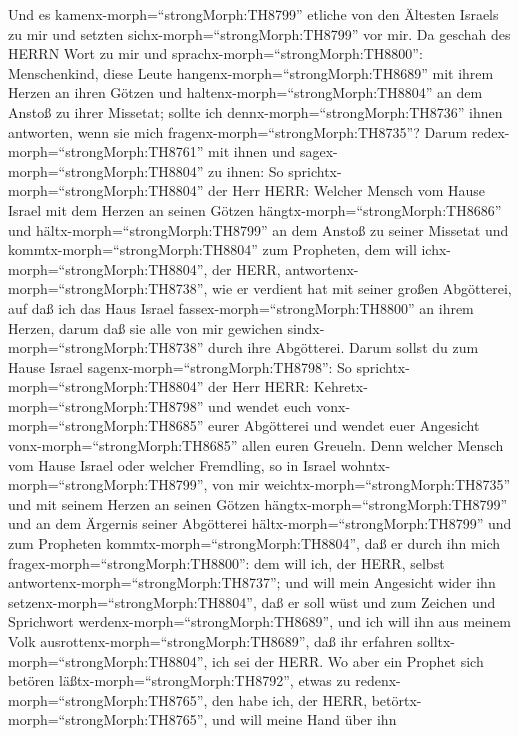  Und es kamenx-morph=``strongMorph:TH8799'' etliche von den
Ältesten Israels zu mir und setzten sichx-morph=``strongMorph:TH8799''
vor mir.  Da geschah des HERRN Wort zu mir und
sprachx-morph=``strongMorph:TH8800'':  Menschenkind, diese
Leute hangenx-morph=``strongMorph:TH8689'' mit ihrem Herzen an ihren
Götzen und haltenx-morph=``strongMorph:TH8804'' an dem Anstoß zu ihrer
Missetat; sollte ich dennx-morph=``strongMorph:TH8736'' ihnen antworten,
wenn sie mich fragenx-morph=``strongMorph:TH8735''?  Darum
redex-morph=``strongMorph:TH8761'' mit ihnen und
sagex-morph=``strongMorph:TH8804'' zu ihnen: So
sprichtx-morph=``strongMorph:TH8804'' der Herr HERR: Welcher Mensch vom
Hause Israel mit dem Herzen an seinen Götzen
hängtx-morph=``strongMorph:TH8686'' und
hältx-morph=``strongMorph:TH8799'' an dem Anstoß zu seiner Missetat und
kommtx-morph=``strongMorph:TH8804'' zum Propheten, dem will
ichx-morph=``strongMorph:TH8804'', der HERR,
antwortenx-morph=``strongMorph:TH8738'', wie er verdient hat mit seiner
großen Abgötterei,  auf daß ich das Haus Israel
fassex-morph=``strongMorph:TH8800'' an ihrem Herzen, darum daß sie alle
von mir gewichen sindx-morph=``strongMorph:TH8738'' durch ihre
Abgötterei.  Darum sollst du zum Hause Israel
sagenx-morph=``strongMorph:TH8798'': So
sprichtx-morph=``strongMorph:TH8804'' der Herr HERR:
Kehretx-morph=``strongMorph:TH8798'' und wendet euch
vonx-morph=``strongMorph:TH8685'' eurer Abgötterei und wendet euer
Angesicht vonx-morph=``strongMorph:TH8685'' allen euren Greueln.
 Denn welcher Mensch vom Hause Israel oder welcher
Fremdling, so in Israel wohntx-morph=``strongMorph:TH8799'', von mir
weichtx-morph=``strongMorph:TH8735'' und mit seinem Herzen an seinen
Götzen hängtx-morph=``strongMorph:TH8799'' und an dem Ärgernis seiner
Abgötterei hältx-morph=``strongMorph:TH8799'' und zum Propheten
kommtx-morph=``strongMorph:TH8804'', daß er durch ihn mich
fragex-morph=``strongMorph:TH8800'': dem will ich, der HERR, selbst
antwortenx-morph=``strongMorph:TH8737'';  und will mein
Angesicht wider ihn setzenx-morph=``strongMorph:TH8804'', daß er soll
wüst und zum Zeichen und Sprichwort
werdenx-morph=``strongMorph:TH8689'', und ich will ihn aus meinem Volk
ausrottenx-morph=``strongMorph:TH8689'', daß ihr erfahren
solltx-morph=``strongMorph:TH8804'', ich sei der HERR.  Wo
aber ein Prophet sich betören läßtx-morph=``strongMorph:TH8792'', etwas
zu redenx-morph=``strongMorph:TH8765'', den habe ich, der HERR,
betörtx-morph=``strongMorph:TH8765'', und will meine Hand über ihn
